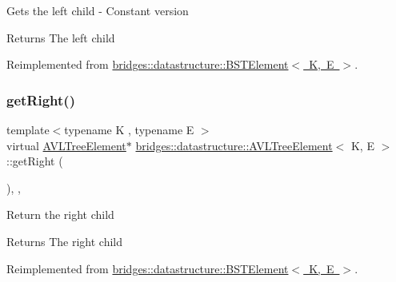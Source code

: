 Gets the left child -\/ Constant version

\begin{DoxyReturn}{Returns}
The left child 
\end{DoxyReturn}


Reimplemented from \mbox{\hyperlink{classbridges_1_1datastructure_1_1_b_s_t_element_abac324ef0b480420bd82ecfe4501d60d}{bridges\+::datastructure\+::\+B\+S\+T\+Element$<$ K, E $>$}}.

\mbox{\label{classbridges_1_1datastructure_1_1_a_v_l_tree_element_aed585fdf56fcbfebac6cd0262c9c1807}} 
\subsubsection{\texorpdfstring{get\+Right()}{getRight()}\hspace{0.1cm}{\footnotesize\ttfamily [1/2]}}
{\footnotesize\ttfamily template$<$typename K , typename E $>$ \\
virtual \mbox{\hyperlink{classbridges_1_1datastructure_1_1_a_v_l_tree_element}{A\+V\+L\+Tree\+Element}}$\ast$ \mbox{\hyperlink{classbridges_1_1datastructure_1_1_a_v_l_tree_element}{bridges\+::datastructure\+::\+A\+V\+L\+Tree\+Element}}$<$ K, E $>$\+::get\+Right (\begin{DoxyParamCaption}{ }\end{DoxyParamCaption})\hspace{0.3cm}{\ttfamily [inline]}, {\ttfamily [override]}, {\ttfamily [virtual]}}

Return the right child \begin{DoxyReturn}{Returns}
The right child 
\end{DoxyReturn}


Reimplemented from \mbox{\hyperlink{classbridges_1_1datastructure_1_1_b_s_t_element_a80f5085d6d03805dd3091b7693d8e235}{bridges\+::datastructure\+::\+B\+S\+T\+Element$<$ K, E $>$}}.

\mbox{\label{classbridges_1_1datastructure_1_1_a_v_l_tree_element_a5a2c4b96b51da1daa3c0426882250acb}} 
